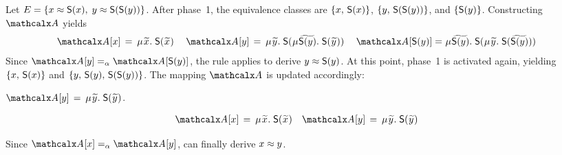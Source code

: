 
\begin{examplex}
Let $E = \{ x \approx \textsf{S}(x),\; y \approx \textsf{S}(\textsf{S}(y)) \}$.
After phase~1, the equivalence classes %
are
$\{ x,\, \textsf{S}(x) \}$,
$\{ y,\, \textsf{S}(\textsf{S}(y)) \}$,
and $\{ \textsf{S}(y) \}$.
Constructing $\Val$ yields
\begin{align*}
\Val \ec{x} & \,=\, \MU {\Varec{x}}.\; \const{S}(\Varec{x}) &
\kern0.25em %
\Val \ec{y} & \,=\,
\MU {\Varec{y}}.\; \const{S}(\smash{\MU {\VAREC{\const{S}(y)}}}.\; \const{S}( {\Varec{y}} ) )
\kern0.25em %
 &
\Val \ec{\const{S}(y)} & =
\MU {\VAREC{\const{S}(y)}}.\; \const{S}(\MU {\Varec{y}}.\; \const{S}( {\VAREC{\const{S}(y)}} ) )
\end{align*}
Since $\Val \ec{y} \aequiv \Val \ec{\const{S}(y)}$,
the  rule applies to derive $y \approx \textsf{S}(y)$.
%
At this point, phase~1 is activated again, %
yielding
$\{ x,\, \textsf{S}(x) \}$ and
$\{ y,\, \textsf{S}(y),\allowbreak\, \textsf{S}(\textsf{S}(y)) \}$.
The mapping $\Val$ is updated accordingly:
\begin{conf}%
$\Val \ec{y} \,=\, \MU {\Varec{y}}.\; \const{S}({\Varec{y}})$.
\end{conf}%
\begin{rep}
\begin{align*}
\Val \ec{x} & \,=\, \MU {\Varec{x}}.\; \const{S}(\Varec{x})
&
\Val \ec{y} & \,=\, \MU {\Varec{y}}.\; \const{S}({\Varec{y}})
\end{align*}
\end{rep}
Since $\Val \ec{x} \aequiv \Val \ec{y}$,
 can finally derive $x \approx y$.
\xend
\end{examplex}

